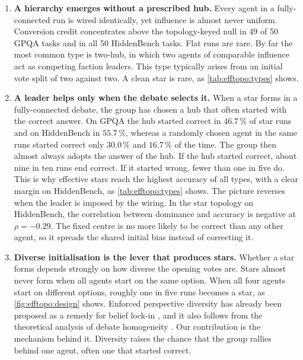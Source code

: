 \begin{enumerate}
\renewcommand{\labelenumi}{(\roman{enumi})}
  \item \textbf{A hierarchy emerges without a prescribed hub.} Every agent in a fully-connected
        run is wired identically, yet influence is almost never uniform. Conversion
        credit concentrates above the topology-keyed null in 49 of 50 GPQA tasks and
        in all 50 HiddenBench tasks. Flat runs are rare. By far the most common type
        is two-hub, in which two agents of comparable influence act as competing
        faction leaders. This type typically arises from an initial vote split of
        two against two. A clean star is rare, as \autoref{tab:efftopo:types} shows.

  \item \textbf{A leader helps only when the debate selects it.} When a star forms
        in a fully-connected debate, the group has chosen a hub that often started
        with the correct answer. On GPQA the hub started correct in $46.7\,\%$ of
        star runs and on HiddenBench in $55.7\,\%$, whereas a randomly chosen
        agent in the same runs started correct only $30.0\,\%$ and $16.7\,\%$ of
        the time.
        The group then almost always adopts the answer of the hub. If the hub started
        correct, about nine in ten runs end correct. If it started wrong, fewer than
        one in five do. This is why effective stars reach the highest accuracy of all
        types, with a clear margin on HiddenBench, as \autoref{tab:efftopo:types}
        shows. The picture reverses when the leader is imposed by the wiring. In the
        star topology on HiddenBench, the correlation between dominance and accuracy
        is negative at $\rho = -0.29$. The fixed centre is no more likely to be
        correct than any other agent, so it spreads the shared initial bias instead
        of correcting it.

  \item \textbf{Diverse initialisation is the lever that produces stars.} Whether a
        star forms depends strongly on how diverse the opening votes are. Stars
        almost never form when all agents start on the same option. When all four
        agents start on different options, roughly one in five runs becomes a star,
        as \autoref{fig:efftopo:design} shows. Enforced perspective diversity has
        already been proposed as a remedy for belief lock-in
        \citep{oh2026entrenchment}, and it also follows from the theoretical analysis
        of debate homogeneity \citep{estornell2024multillm}. Our contribution is the
        mechanism behind it. Diversity raises the chance that the group rallies
        behind one agent, often one that started correct.
\end{enumerate}

